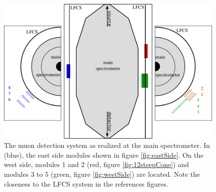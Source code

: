   \begin{figure}
  	\centering
  	\includegraphics[width = \textwidth]{graphics/muonModules/muonSetup.png}
  	\caption[Muon module setup]{The muon detection system as realized at the main spectrometer. In (blue), the east side modules shown in figure \ref{fig:eastSide}. On the west side, modules 1 and 2 (red, figure \ref{fig:12steepCone}) and modules 3 to 5 (green, figure \ref{fig:westSide}) are located. Note the closeness to the LFCS system in the references figures.}
  	\label{fig:muonSetup}
  	\begin{minipage}{0.49\textwidth}


\end{minipage}
\end{figure}
